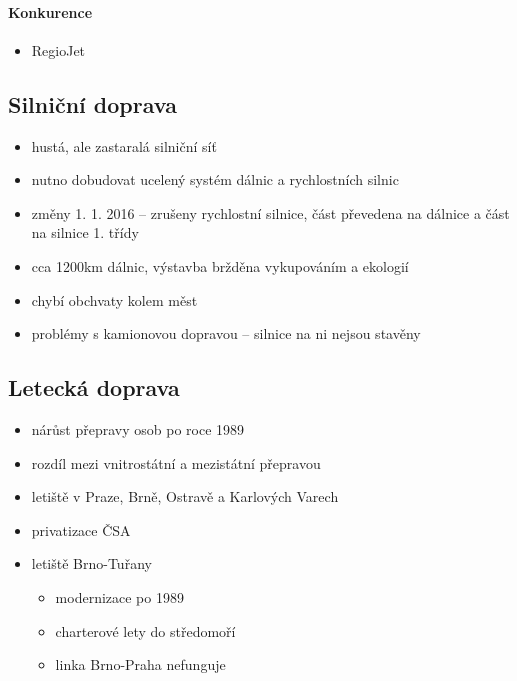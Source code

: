 \paragraph{Konkurence}
\begin{itemize}
\item RegioJet
\end{itemize}

\subsection{Silniční doprava}
\begin{itemize}
\item hustá, ale zastaralá silniční síť
\item nutno dobudovat ucelený systém dálnic a rychlostních silnic
\item změny 1. 1. 2016 -- zrušeny rychlostní silnice, část převedena na dálnice a část na silnice 1. třídy
\item cca 1200km dálnic, výstavba bržděna vykupováním a ekologií
\item chybí obchvaty kolem měst
\item problémy s kamionovou dopravou -- silnice na ni nejsou stavěny
\end{itemize}

\subsection{Letecká doprava}
\begin{itemize}
\item nárůst přepravy osob po roce 1989
\item rozdíl mezi vnitrostátní a mezistátní přepravou
\item letiště v Praze, Brně, Ostravě a Karlových Varech
\item privatizace ČSA
\item letiště Brno-Tuřany
	\begin{itemize}
	\item modernizace po 1989
	\item charterové lety do středomoří
	\item linka Brno-Praha nefunguje
	\end{itemize}
\end{itemize}

